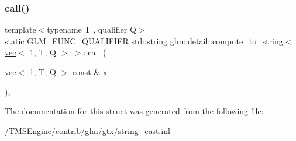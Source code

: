 \subsubsection{\texorpdfstring{call()}{call()}}
{\footnotesize\ttfamily template$<$typename T , qualifier Q$>$ \\
static \hyperlink{setup_8hpp_a33fdea6f91c5f834105f7415e2a64407}{G\+L\+M\+\_\+\+F\+U\+N\+C\+\_\+\+Q\+U\+A\+L\+I\+F\+I\+ER} \hyperlink{_s_d_l__opengl__glext_8h_ae84541b4f3d8e1ea24ec0f466a8c568b}{std\+::string} \hyperlink{structglm_1_1detail_1_1compute__to__string}{glm\+::detail\+::compute\+\_\+to\+\_\+string}$<$ \hyperlink{structglm_1_1vec}{vec}$<$ 1, T, Q $>$ $>$\+::call (\begin{DoxyParamCaption}\item[{\hyperlink{structglm_1_1vec}{vec}$<$ 1, T, Q $>$ const \&}]{x }\end{DoxyParamCaption})\hspace{0.3cm}{\ttfamily [inline]}, {\ttfamily [static]}}



The documentation for this struct was generated from the following file\+:\begin{DoxyCompactItemize}
\item 
/\+T\+M\+S\+Engine/contrib/glm/gtx/\hyperlink{string__cast_8inl}{string\+\_\+cast.\+inl}\end{DoxyCompactItemize}
